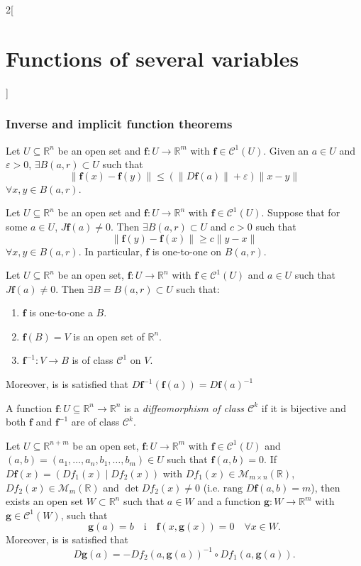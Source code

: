 \documentclass[class=article,10pt,crop=false]{standalone}
\begin{document}
\begin{multicols}{2}[\section{Functions of several variables}]
\subsubsection{Inverse and implicit function theorems}
\begin{lemma}
Let $U\subseteq\mathbb{R}^n$ be an open set and $\boldsymbol{f}:U\rightarrow\mathbb{R}^m$ with $\boldsymbol{f}\in \mathcal{C}^1(U)$. Given an $a\in U$ and $\varepsilon>0$, $\exists B(a,r)\subset U$ such that $$\|\boldsymbol{f}(x)-\boldsymbol{f}(y)\|\leq(\|D\boldsymbol{f}(a)\|+\varepsilon)\|x-y\|$$ $\forall x,y\in B(a,r)$.
\end{lemma}
\begin{lemma}
Let $U\subseteq\mathbb{R}^n$ be an open set and $\boldsymbol{f}:U\rightarrow\mathbb{R}^n$ with $\boldsymbol{f}\in \mathcal{C}^1(U)$. Suppose that for some $a\in U$, $J\boldsymbol{f}(a)\ne 0$. Then $\exists B(a,r)\subset U$ and $c>0$ such that $$\|\boldsymbol{f}(y)-\boldsymbol{f}(x)\|\geq c\|y-x\|$$ $\forall x,y\in B(a,r)$. In particular, $\boldsymbol{f}$ is one-to-one on $B(a,r)$.
\end{lemma}
\begin{theorem}
Let $U\subseteq\mathbb{R}^n$ be an open set, $\boldsymbol{f}:U\rightarrow\mathbb{R}^n$ with $\boldsymbol{f}\in \mathcal{C}^1(U)$ and $a\in U$ such that $J\boldsymbol{f}(a)\ne0$. Then $\exists B=B(a,r)\subset U$ such that:
\begin{enumerate}
    \item $\boldsymbol{f}$ is one-to-one a $B$.
    \item $\boldsymbol{f}(B)=V$ is an open set of $\mathbb{R}^n$.
    \item $\boldsymbol{f}^{-1}:V\rightarrow B$ is of class $\mathcal{C}^1$ on $V$.
\end{enumerate} Moreover, is is satisfied that $D\boldsymbol{f}^{-1}(\boldsymbol{f}(a))=D\boldsymbol{f}(a)^{-1}$
\end{theorem}
\begin{definition}
A function $\boldsymbol{f}:U\subseteq\mathbb{R}^n\rightarrow\mathbb{R}^n$ is a \textit{diffeomorphism of class $\mathcal{C}^k$} if it is bijective and both $\boldsymbol{f}$ and $\boldsymbol{f}^{-1}$ are of class $\mathcal{C}^k$.
\end{definition}
\begin{theorem}
Let $U\subseteq\mathbb{R}^{n+m}$ be an open set, $\boldsymbol{f}:U\rightarrow\mathbb{R}^m$ with $\boldsymbol{f}\in \mathcal{C}^1(U)$ and $(a,b)=(a_1,\ldots,a_n,b_1,\ldots,b_m)\in U$ such that $\boldsymbol{f}(a,b)=0$. If $D\boldsymbol{f}(x)=(Df_1(x)\;|\;Df_2(x))$ with $Df_1(x)\in\mathcal{M}_{m\times n}(\mathbb{R})$, $Df_2(x)\in\mathcal{M}_m(\mathbb{R})$ and $\det Df_2(x)\ne 0$ (i.e. $\text{rang }D\boldsymbol{f}(a,b)=m$), then exists an open set $W\subset\mathbb{R}^n$ such that $a\in W$ and a function $\boldsymbol{g}:W\rightarrow\mathbb{R}^m$ with $\boldsymbol{g}\in\mathcal{C}^1(W)$, such that $$\boldsymbol{g}(a)=b\quad\text{i}\quad \boldsymbol{f}(x,\boldsymbol{g}(x))=0\quad\forall x\in W.$$ Moreover, is is satisfied that $$D\boldsymbol{g}(a)=-Df_2(a,\boldsymbol{g}(a))^{-1}\circ Df_1(a,\boldsymbol{g}(a)).$$
\end{theorem}

\end{multicols}
\end{document}
